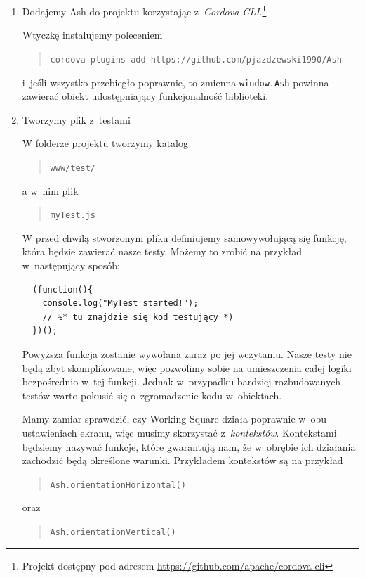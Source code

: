 \documentclass[brudnopis]{xmgr}
\begin{document}
\begin{enumerate}
  \item Dodajemy Ash do projektu korzystając z~\textit{Cordova CLI}.\footnote{Projekt dostępny pod adresem \url{https://github.com/apache/cordova-cli}}

Wtyczkę instalujemy poleceniem 
\begin{quote}
   \texttt{cordova plugins add https://github.com/pjazdzewski1990/Ash}
\end{quote}
i~jeśli wszystko przebiegło poprawnie, to zmienna \texttt{window.Ash} powinna zawierać obiekt udostępniający funkcjonalność biblioteki.  

 \item Tworzymy plik z~testami

W folderze projektu tworzymy katalog 
\begin{quote}
  \texttt{www/test/}
\end{quote} 
a w~nim plik 
\begin{quote}
  \texttt{myTest.js}
\end{quote} 
W przed chwilą stworzonym pliku definiujemy samowywołującą się funkcję, która będzie zawierać nasze testy. Możemy  to zrobić na przykład w~następujący sposób:

 \begin{lstlisting}
  (function(){
	console.log("MyTest started!");
	// %* tu znajdzie się kod testujący *)
  })();
\end{lstlisting}

Powyższa funkcja zostanie wywołana zaraz po jej wczytaniu. Nasze testy nie będą zbyt skomplikowane, więc pozwolimy sobie na umieszczenia całej logiki bezpośrednio w~tej funkcji. Jednak w~przypadku bardziej rozbudowanych testów warto pokusić się o~zgromadzenie kodu w~obiektach.

Mamy zamiar sprawdzić, czy Working Square działa poprawnie w~obu ustawieniach ekranu, więc musimy skorzystać z~\textit{kontekstów}. Kontekstami będziemy nazywać funkcje, które gwarantują nam, że w~obrębie ich działania zachodzić będą określone warunki. Przykładem kontekstów są na przykład

\begin{quote}
   \texttt{Ash.orientationHorizontal()}
\end{quote}

oraz 

\begin{quote}
   \texttt{Ash.orientationVertical()}
\end{quote}


\end{enumerate}
\end{document}

